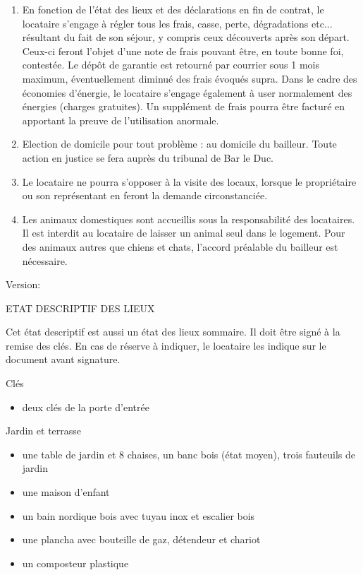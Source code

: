 \documentclass[a4paper,11pt]{article}
\begin{document}
\begin{enumerate}
\item En fonction de l’état des lieux et des déclarations en fin de contrat, le locataire s’engage à régler tous les frais, casse, perte, dégradations etc... résultant du fait de son séjour, y compris ceux découverts après son départ.
Ceux-ci feront l'objet d'une note de frais pouvant être, en toute bonne foi, contestée. 
Le dépôt de garantie est retourné par courrier sous 1 mois maximum, éventuellement diminué des frais évoqués supra.
Dans le cadre des économies d’énergie, le locataire s’engage également à user normalement des énergies (charges gratuites).
Un supplément de frais pourra être facturé en apportant la preuve de l’utilisation anormale.

\item Election de domicile pour tout problème : au domicile du bailleur. Toute action en justice se fera auprès du tribunal de Bar le Duc.

\item Le locataire ne pourra s’opposer à la visite des locaux, lorsque le propriétaire ou son représentant en feront la demande circonstanciée.

\item Les animaux domestiques sont accueillis sous la responsabilité des locataires. Il est interdit au locataire de laisser un animal seul dans le logement. Pour des animaux autres que chiens et chats, l'accord préalable du bailleur est nécessaire.

\end{enumerate}

\hspace{10cm}
Version: \date{\today}


\normalsize

\newpage{}

ETAT DESCRIPTIF DES LIEUX
 
Cet état descriptif est aussi un état des lieux sommaire. Il doit être signé à la remise des clés. En cas de réserve à indiquer, le locataire les indique sur le document avant signature.

\vspace{0.25cm}


Clés
\begin{itemize}
\item deux clés de la porte d'entrée
\end{itemize}


\vspace{0.25cm}

Jardin et terrasse
\begin{itemize}
\item une table de jardin et 8 chaises, un banc bois (état moyen), trois fauteuils de jardin
\item une maison d'enfant
\item un bain nordique bois avec tuyau inox et escalier bois
\item une plancha avec bouteille de gaz, détendeur et chariot
\item un composteur plastique
\end{itemize}
\end{document}
